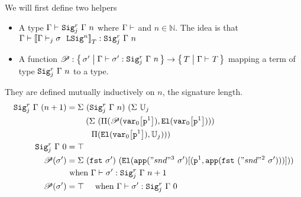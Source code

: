 We will first define two helpers
\begin{itemize}
  \item A type $\goodType{\Gamma}{\Sigr{\Gamma}{n}{j}}{}$ where
  $\goodCtx{\Gamma}{}$ and $n \in \mathbb{N}$.
  The idea is that $\goodTerm{\Gm}{\denotesT{\goodSigU{j}{\Gamma}{\lsig}{n}}}{\Sigr{\Gm}{n}{j}}$
  \item A function $\mathscr{P} : \setc{\lsig'}{ \goodTerm{\Gm}{\lsig'}{\Sigr{\Gm}{n}{j}} } \to \setc{T}{ \goodType{\Gm}{T}{} }$ mapping a term of type $\Sigr{\Gm}{n}{j}$ to a type.
\end{itemize}
They are defined mutually inductively on $n$, the signature length.
\begin{align*}
  {\Sigr{\Gamma}{(n+1)}{j}} &= 
    \Sigma~(\Sigr{\Gamma}{n}{j})
          ~(\Sigma~\cU_j \\
          & \quad \quad ~(\Sigma~(\TyPi{{\mathscr{P}({\sub{\var{0}}{\SubstWeak{1}}})}}{\El{\sub{\var{0}}{\SubstWeak{1}}}}) \\
          & \quad \quad \quad \TyPi{\El{\sub{\var{0}}{\SubstWeak{1}}}}{\cU_j})) \\
  \Sigr{\Gamma}{0}{j} &= \top \\
  \mathscr{P}(\lsig') &=  
    \Sigma~(\fst{\lsig'})~(\El{\app{"snd"^3~\lsig'}[(\SubstWeak{1}, \app{\fst{("snd"^2~{\lsig'})}})]}) \\ & \text{ when } \goodTerm{\Gm}{\lsig'}{\Sigr{\Gm}{n+1}{j}} \\
  \mathscr{P}(\lsig') &=  \top \quad \text{ when } \goodTerm{\Gm}{\lsig'}{\Sigr{\Gm}{0}{j}}  \\
\end{align*}



